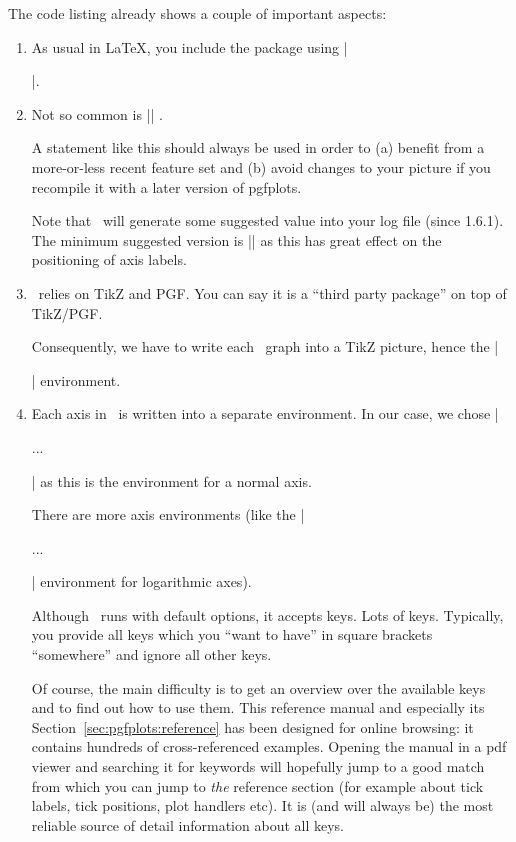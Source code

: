 The code listing already shows a couple of important aspects:
\begin{enumerate}
	\item As usual in \LaTeX, you include the package using |\usepackage{pgfplots}|.
	\item Not so common is |\pgfplotsset{compat=1.5}| . 
	
	A statement like this should always be used in order to (a) benefit from a more-or-less recent feature set and (b) avoid changes to your picture if you recompile it with a later version of pgfplots.

	Note that \PGFPlots\ will generate some suggested value into your log file (since 1.6.1). The minimum suggested version is |\pgfplotsset{compat=1.3}| as this has great effect on the positioning of axis labels.
	
	\item \PGFPlots\ relies on TikZ and PGF. You can say it is a ``third party package'' on top of TikZ/PGF.
	
	Consequently, we have to write each \PGFPlots\ graph into a TikZ picture, hence the || environment.
	\item
		Each axis in \PGFPlots\ is written into a separate environment. In our case, we chose |\begin{axis} ... \end{axis}| as this is the environment for a normal axis.

		There are more axis environments (like the |\begin{loglogaxis} ... \end{loglogaxis}| environment for logarithmic axes).

		Although \PGFPlots\ runs with default options, it accepts keys. Lots of keys. Typically, you provide all keys which you ``want to have'' in square brackets ``somewhere'' and ignore all other keys. 
		
		Of course, the main difficulty is to get an overview over the available keys and to find out how to use them. This reference manual and especially its Section~\ref{sec:pgfplots:reference} has been designed for online browsing: it contains hundreds of cross-referenced examples. Opening the manual in a pdf viewer and searching it for keywords will hopefully jump to a good match from which you can jump to \emph{the} reference section (for example about tick labels, tick positions, plot handlers etc). It is (and will always be) the most reliable source of detail information about all keys.
		

\end{enumerate}
